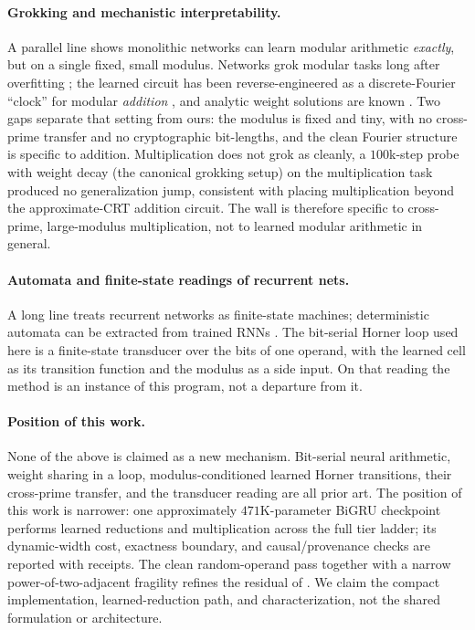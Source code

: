\documentclass[11pt]{article}
\begin{document}
\paragraph{Grokking and mechanistic interpretability.}
A parallel line shows monolithic networks can learn modular arithmetic \emph{exactly},
but on a single fixed, small modulus. Networks grok modular tasks long after overfitting
\citep{power2022grokking}; the learned circuit has been reverse-engineered as a
discrete-Fourier ``clock'' for modular \emph{addition} \citep{nanda2023progress}, and
analytic weight solutions are known \citep{gromov2023grokking}. Two gaps separate that
setting from ours: the modulus is fixed and tiny, with no cross-prime transfer and no
cryptographic bit-lengths, and the clean Fourier structure is specific to addition.
Multiplication does not grok as cleanly, a $100$k-step probe with weight decay (the
canonical grokking setup) on the multiplication task produced no generalization jump,
consistent with \citet{mccracken2025modadd} placing multiplication beyond the
approximate-CRT addition circuit. The wall is therefore specific to cross-prime,
large-modulus multiplication, not to learned modular arithmetic in general.

\paragraph{Automata and finite-state readings of recurrent nets.}
A long line treats recurrent networks as finite-state machines; deterministic
automata can be extracted from trained RNNs \citep{weiss2018automata}. The
bit-serial Horner loop used here is a finite-state transducer over the bits of one
operand, with the learned cell as its transition function and the modulus as a side
input. On that reading the method is an instance of this program, not a departure
from it.

\paragraph{Position of this work.}
None of the above is claimed as a new mechanism. Bit-serial neural arithmetic,
weight sharing in a loop, modulus-conditioned learned Horner transitions, their
cross-prime transfer, and the transducer reading are all prior art. The position
of this work is narrower: one approximately $471$K-parameter BiGRU checkpoint
performs learned reductions and multiplication across the full tier ladder; its
dynamic-width cost, exactness boundary, and causal/provenance checks are reported
with receipts. The clean random-operand pass together with a narrow
power-of-two-adjacent fragility refines the residual of
\citet{price2016neural}. We claim the compact implementation, learned-reduction
path, and characterization, not the shared formulation or architecture.
\end{document}
